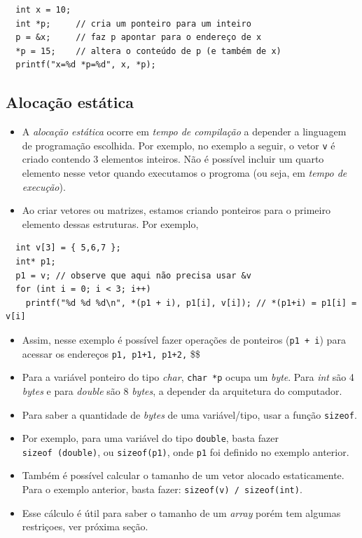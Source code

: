 \documentclass[12pt,a4paper]{article}
\providecommand{\tightlist}{%
      \setlength{\itemsep}{0pt}\setlength{\parskip}{0pt}}
\begin{document}
\begin{verbatim}
  int x = 10;
  int *p;     // cria um ponteiro para um inteiro
  p = &x;     // faz p apontar para o endereço de x
  *p = 15;    // altera o conteúdo de p (e também de x)
  printf("x=%d *p=%d", x, *p);
\end{verbatim}

    \hypertarget{alocauxe7uxe3o-estuxe1tica}{%
\subsection{Alocação estática}\label{alocauxe7uxe3o-estuxe1tica}}

    \begin{itemize}
\tightlist
\item
  A \emph{alocação estática} ocorre em \emph{tempo de compilação} a
  depender a linguagem de programação escolhida. Por exemplo, no exemplo
  a seguir, o vetor \texttt{v} é criado contendo 3 elementos inteiros.
  Não é possível incluir um quarto elemento nesse vetor quando
  executamos o progroma (ou seja, em \emph{tempo de execução}).
\item
  Ao criar vetores ou matrizes, estamos criando ponteiros para o
  primeiro elemento dessas estruturas. Por exemplo,
\end{itemize}

\begin{verbatim}
  int v[3] = { 5,6,7 };
  int* p1;
  p1 = v; // observe que aqui não precisa usar &v
  for (int i = 0; i < 3; i++)
    printf("%d %d %d\n", *(p1 + i), p1[i], v[i]); // *(p1+i) = p1[i] = v[i]
\end{verbatim}

\begin{itemize}
\item
  Assim, nesse exemplo é possível fazer operações de ponteiros
  (\texttt{p1\ +\ i}) para acessar os endereços
  \texttt{p1,\ p1+1,\ p1+2,} \$\cdots \$
\item
  Para a variável ponteiro do tipo \emph{char}, \texttt{char\ *p} ocupa
  um \emph{byte}. Para \emph{int} são 4 \emph{bytes} e para
  \emph{double} são 8 \emph{bytes}, a depender da arquitetura do
  computador.
\item
  Para saber a quantidade de \emph{bytes} de uma variável/tipo, usar a
  função \texttt{sizeof}.
\item
  Por exemplo, para uma variável do tipo \texttt{double}, basta fazer
  \texttt{sizeof\ (double)}, ou \texttt{sizeof(p1)}, onde \texttt{p1}
  foi definido no exemplo anterior.
\item
  Também é possível calcular o tamanho de um vetor alocado
  estaticamente. Para o exemplo anterior, basta fazer:
  \texttt{sizeof(v)\ /\ sizeof(int)}.
\item
  Esse cálculo é útil para saber o tamanho de um \emph{array} porém tem
  algumas restriçoes, ver próxima seção.
\end{itemize}
\end{document}
